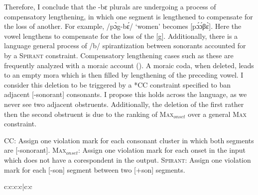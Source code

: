 \documentclass[output=paper,colorlinks,citecolor=brown,
]{langscibook}
\begin{document}
Therefore, I conclude that the -bɛ plurals are undergoing a process of compensatory lengthening, in which one segment is lengthened to compensate for the loss of another. For example, /pɔ̀g-bɛ́/ `women' becomes [pɔ́ɔ́βɛ̀]. Here the vowel lengthens to compensate for the loss of the [g]. Additionally, there is a language general process of /b/ spirantization between sonorants accounted for by a \textsc{Spirant} constraint. Compensatory lengthening cases such as these are frequently analyzed with a moraic account (\citealp{hayes1989, shaw}). A moraic coda, when deleted, leads to an empty mora which is then filled by lengthening of the preceding vowel. I consider this deletion to be triggered by a *CC constraint specified to ban adjacent [-sonorant] consonants. I propose this holds across the language, as we never see two adjacent obstruents. Additionally, the deletion of the first rather then the second obstruent is due to the ranking of \textsc{Max}$_{onset}$ over a general \textsc{Max} constraint.

\ea \begin{xlist}
    \ex *CC: Assign one violation mark for each consonant cluster in which both segments are [-sonorant].
    \ex\textsc{Max}$_{onset}$: Assign one violation mark for each onset in the input which does not have a corespondent  in the output.
    \ex \textsc{Spirant}: Assign one violation mark for each [-son] segment between two [+son] segments.
\end{xlist}
\z

\begin{table}

  \caption{Tableau deriving [pɔ̀ɔ̀βɛ́] `women'}
  \label{tab:Caragine:women}
  
\begin{tableau}{c:c:c:c|c:c} 
  \vio{*!} \vio{}  \vio{} \vio{}\vio{}\vio{}
 \vio{} \vio{}  \vio{} \vio{*!} \vio{*}\vio{*}
 \vio{} \vio{*!}  \vio{} \vio{} \vio{*}\vio{*}
 \vio{} \vio{}  \vio{}  \vio{}\vio{*}\vio{*}
 \vio{} \vio{}  \vio{*!}  \vio{}\vio{}\vio{*}
\end{tableau}
\end{table}
\end{document}

